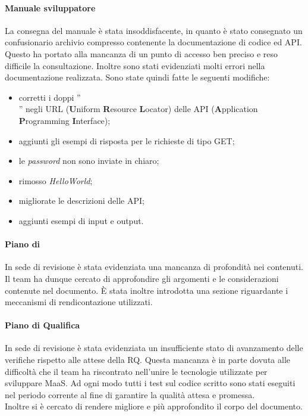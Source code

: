 \paragraph*{Manuale sviluppatore}
La consegna del manuale è stata insoddisfacente, in quanto è stato consegnato un confusionario archivio compresso contenente la documentazione di codice ed API. Questo ha portato alla mancanza di un punto di accesso ben preciso e reso difficile la consultazione. Inoltre sono stati evidenziati molti errori nella documentazione realizzata. Sono state quindi fatte le seguenti modifiche:
\begin{itemize}
\item corretti i doppi ''\\'' negli URL (\textbf{U}niform \textbf{R}esource \textbf{L}ocator) delle API (\textbf{A}pplication \textbf{P}rogramming \textbf{I}nterface);
\item aggiunti gli esempi di risposta per le richieste di tipo GET;
\item le \textit{password} non sono inviate in chiaro;
\item rimosso \textit{HelloWorld};
\item migliorate le descrizioni delle API;
\item aggiunti esempi di input e output.
\end{itemize}

\paragraph*{Piano di }
In sede di revisione è stata evidenziata una mancanza di profondità nei contenuti. Il team ha dunque cercato di approfondire gli argomenti e le considerazioni contenute nel documento. È stata inoltre introdotta una sezione riguardante i meccanismi di rendicontazione utilizzati.

\paragraph*{Piano di Qualifica}
In sede di revisione è stata evidenziata un insufficiente stato di avanzamento delle verifiche rispetto alle attese della RQ. Questa mancanza è in parte dovuta alle difficoltà che il team ha riscontrato nell'unire le tecnologie utilizzate per sviluppare MaaS. Ad ogni modo tutti i test sul codice scritto sono stati eseguiti nel periodo corrente al fine di garantire la qualità attesa e promessa. \\
Inoltre si è cercato di rendere migliore e più approfondito il corpo del documento.
